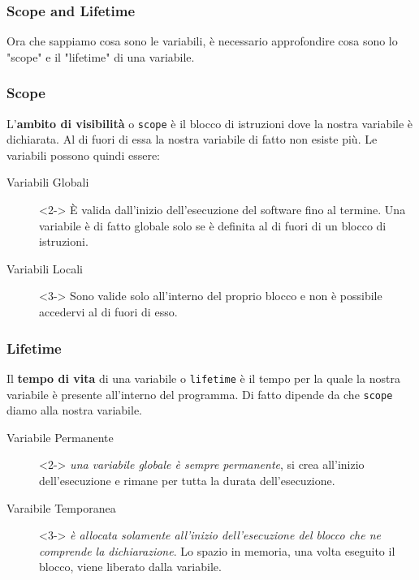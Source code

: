 \documentclass[handout]{beamer}
\begin{document}
    \begin{frame}
        \frametitle{Scope and Lifetime}
        Ora che sappiamo cosa sono le variabili, è necessario approfondire cosa sono lo "scope" e il "lifetime" di una variabile.
    \end{frame}

    \begin{frame}
        \frametitle{Scope}
        L'\textbf{ambito di visibilità} o \texttt{scope} è il blocco di istruzioni dove la nostra variabile è dichiarata. Al di fuori di essa la nostra variabile di fatto non esiste più. Le variabili possono quindi essere:
        \begin{description}
            \item[Variabili Globali]<2-> È valida dall'inizio dell'esecuzione del software fino al termine. Una variabile è di fatto globale solo se è definita al di fuori di un blocco di istruzioni.
            \item[Variabili Locali]<3-> Sono valide solo all'interno del proprio blocco e non è possibile accedervi al di fuori di esso. 
        \end{description}
    \end{frame}

    \begin{frame}
        \frametitle{Lifetime}
        Il \textbf{tempo di vita} di una variabile o \texttt{lifetime} è il tempo per la quale la nostra variabile è presente all'interno del programma. Di fatto dipende da che \texttt{scope} diamo alla nostra variabile.
        \begin{description}
            \item[Variabile Permanente]<2-> \textit{una variabile globale è sempre permanente}, si crea all'inizio dell'esecuzione e rimane per tutta la durata dell'esecuzione.
            \item[Varaibile Temporanea]<3-> \textit{è allocata solamente all'inizio dell'esecuzione del blocco che ne comprende la dichiarazione}. Lo spazio in memoria, una volta eseguito il blocco, viene liberato dalla variabile.
        \end{description}
    \end{frame}
\end{document}
